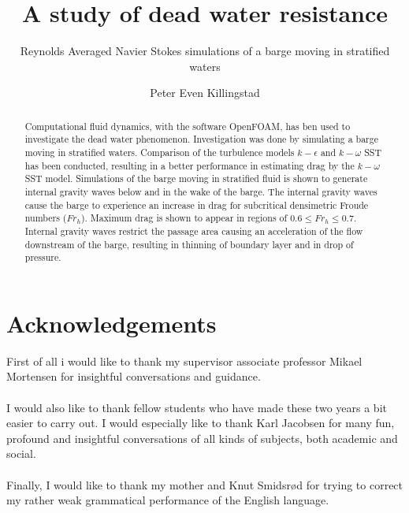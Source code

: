 \documentclass[a4paper, 12pt]{report}
\title{A study of dead water resistance}
\subtitle{Reynolds Averaged Navier Stokes simulations of a barge moving in stratified waters }
\author{Peter Even Killingstad}
\begin{document}
\masterfrontpage
\begin{abstract}
Computational fluid dynamics, with the software OpenFOAM, has ben used to investigate the dead water phenomenon. Investigation was done by simulating a barge moving in stratified waters. Comparison of the turbulence models $k-\epsilon$ and $k-\omega$ SST has been conducted, resulting in a better performance in estimating drag by the $k-\omega$ SST model. Simulations of the barge moving in stratified fluid is shown to generate internal gravity waves below and in the wake of the barge. The internal gravity waves cause the barge to experience an increase in drag for subcritical densimetric Froude numbers ($Fr_h$). Maximum drag is shown to appear in regions of $0.6 \leq Fr_h \leq 0.7$. Internal gravity waves restrict the passage area causing an acceleration of the flow downstream of the barge, resulting in thinning of boundary layer and in drop of pressure.
\end{abstract}
\chapter*{Acknowledgements}
First of all i would like to thank my supervisor associate professor Mikael Mortensen for insightful conversations and guidance.\\
\\
I would also like to thank fellow students who have made these two years a bit easier to carry out. I would especially like to thank Karl Jacobsen for many fun, profound and insightful conversations of all kinds of subjects, both academic and social.\\
\\
Finally, I would like to thank my mother and Knut Smidsrød for trying to correct my rather weak grammatical performance of the English language.
\tableofcontents
\end{document}
